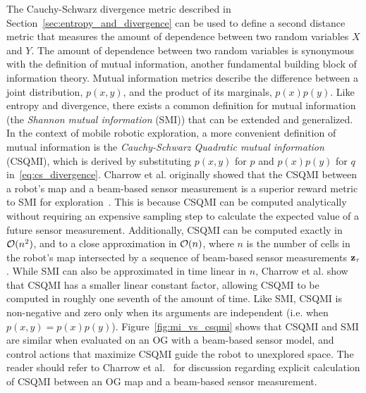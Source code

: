 The Cauchy-Schwarz divergence metric described in Section~\ref{sec:entropy_and_divergence} can be
used to define a second distance metric that measures the amount of dependence
between two random variables $X$ and $Y$. The amount of dependence between two
random variables is synonymous with the definition of mutual information, another
fundamental building block of information theory. Mutual information metrics
describe the difference between a joint distribution, $p(x, y)$, and the product
of its marginals, $p(x)p(y)$. Like entropy and divergence, there exists a common
definition for mutual information (the \textit{Shannon mutual information} (SMI)) that can be
extended and generalized. In the context of mobile robotic exploration, a more convenient
definition of mutual information is the \textit{Cauchy-Schwarz Quadratic mutual
information} (CSQMI), which is derived
by substituting $p(x, y)$ for $p$ and $p(x)p(y)$ for $q$
in~\eqref{eq:cs_divergence}.
%
%
Charrow et al. originally showed that the CSQMI between a robot's map and a beam-based
sensor measurement is a superior reward metric to SMI for
exploration~\cite{charrow2015icra}. This is because CSQMI can be computed
analytically without requiring an expensive sampling step to
calculate the expected value of a future sensor measurement. Additionally,
CSQMI can be computed exactly in $\mathcal{O}(n^2)$, and to a close approximation
in $\mathcal{O}(n)$, where $n$ is the number of cells in the robot's map intersected by a
sequence of beam-based sensor measurements $\mathbf{z}_{\mathbf{\tau}}$. While SMI can also be approximated in time linear in
$n$, Charrow et al. show that CSQMI has a smaller linear constant factor,
allowing CSQMI to be computed in roughly one seventh of the amount of time.
Like SMI, CSQMI is non-negative and zero only when its arguments are independent
(i.e. when $p(x, y) = p(x)p(y)$). Figure~\ref{fig:mi_vs_csqmi} shows that CSQMI and SMI are
similar when evaluated on an OG with a beam-based sensor model, and control actions
that maximize CSQMI guide the robot to unexplored space. The reader should refer
to Charrow et al.~\cite{charrow2015icra} for discussion regarding
explicit calculation of CSQMI between an OG map and a beam-based sensor
measurement.

